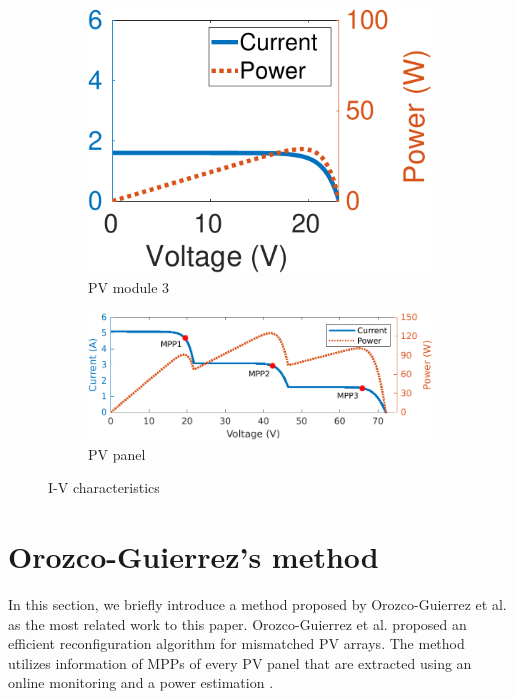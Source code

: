 \documentclass[conference]{pvsctran}
\begin{document}
\begin{figure}
\begin{subfigure}[b]{0.3\linewidth}
        \includegraphics[width=\linewidth]{../fig/m_3.png}
        \caption{PV module 3}
    \end{subfigure}
    \hfill
    \begin{subfigure}[b]{\linewidth}
        \centering
        \vspace{3mm}
        \includegraphics[width=\linewidth]{../fig/panel.png}
        \caption{PV panel}
    \end{subfigure}
    \caption{I-V characteristics}
    \label{fig:IV}
\end{figure}






\section{Orozco-Guierrez's method}\label{Sec3}
In this section, we briefly introduce a method proposed by Orozco-Guierrez et al.\cite{orozco2016optimized} as the most related work to this paper.
Orozco-Guierrez et al. proposed an efficient reconfiguration algorithm for mismatched PV arrays. 
The method utilizes information of MPPs of every PV panel that are extracted using an online monitoring \cite{carotenuto2014online} and a power estimation \cite{orozco2015fast}.
\end{document}
